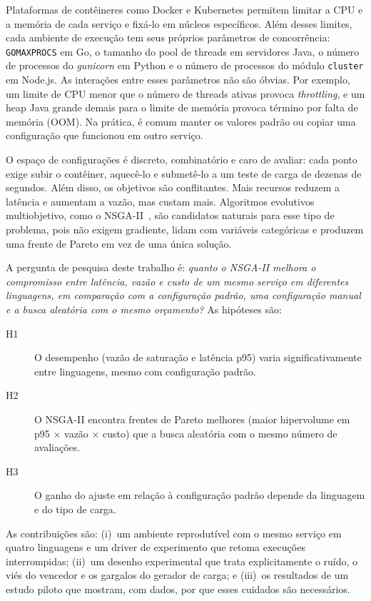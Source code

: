 \documentclass[11pt,a4paper]{article}
\begin{document}
Plataformas de contêineres como Docker e Kubernetes permitem limitar a CPU e a memória de cada serviço e fixá-lo em
núcleos específicos. Além desses limites, cada ambiente de execução tem seus próprios parâmetros de concorrência:
\texttt{GOMAXPROCS} em Go, o tamanho do pool de threads em servidores Java, o número de processos do \emph{gunicorn}
em Python e o número de processos do módulo \texttt{cluster} em Node.js. As interações entre esses parâmetros
não são óbvias. Por exemplo, um limite de CPU menor que o número de threads ativas provoca \emph{throttling}, e
um heap Java grande demais para o limite de memória provoca término por falta de memória (OOM). Na prática, é comum
manter os valores padrão ou copiar uma configuração que funcionou em outro serviço.

O espaço de configurações é discreto, combinatório e caro de avaliar: cada ponto exige subir o contêiner, aquecê-lo e
submetê-lo a um teste de carga de dezenas de segundos. Além disso, os objetivos são conflitantes. Mais recursos
reduzem a latência e aumentam a vazão, mas custam mais. Algoritmos evolutivos multiobjetivo, como o NSGA-II~\cite{deb2002},
são candidatos naturais para esse tipo de problema, pois não exigem gradiente, lidam com variáveis categóricas e
produzem uma frente de Pareto em vez de uma única solução.

A pergunta de pesquisa deste trabalho é: \emph{quanto o NSGA-II melhora o compromisso entre latência, vazão e custo de
um mesmo serviço em diferentes linguagens, em comparação com a configuração padrão, uma configuração manual e a busca
aleatória com o mesmo orçamento?} As hipóteses são:

\begin{description}
  \item[H1] O desempenho (vazão de saturação e latência p95) varia significativamente entre linguagens, mesmo com configuração padrão.
  \item[H2] O NSGA-II encontra frentes de Pareto melhores (maior hipervolume em p95 $\times$ vazão $\times$ custo) que a busca aleatória com o mesmo número de avaliações.
  \item[H3] O ganho do ajuste em relação à configuração padrão depende da linguagem e do tipo de carga.
\end{description}

As contribuições são: (i)~um ambiente reprodutível com o mesmo serviço em quatro linguagens e um driver de experimento
que retoma execuções interrompidas; (ii)~um desenho experimental que trata explicitamente o ruído, o viés do vencedor e
os gargalos do gerador de carga; e (iii)~os resultados de um estudo piloto que mostram, com dados, por que esses
cuidados são necessários.
\end{document}
